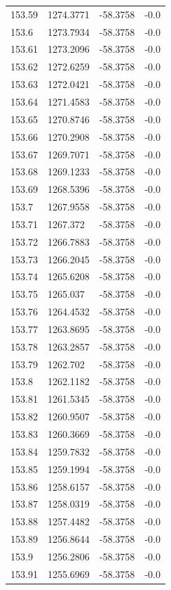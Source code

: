 \begin{table}[H]
\begin{tabular}{llll}
153.59 & 1274.3771 & -58.3758 & -0.0 \\
153.6 & 1273.7934 & -58.3758 & -0.0 \\
153.61 & 1273.2096 & -58.3758 & -0.0 \\
153.62 & 1272.6259 & -58.3758 & -0.0 \\
153.63 & 1272.0421 & -58.3758 & -0.0 \\
153.64 & 1271.4583 & -58.3758 & -0.0 \\
153.65 & 1270.8746 & -58.3758 & -0.0 \\
153.66 & 1270.2908 & -58.3758 & -0.0 \\
153.67 & 1269.7071 & -58.3758 & -0.0 \\
153.68 & 1269.1233 & -58.3758 & -0.0 \\
153.69 & 1268.5396 & -58.3758 & -0.0 \\
153.7 & 1267.9558 & -58.3758 & -0.0 \\
153.71 & 1267.372 & -58.3758 & -0.0 \\
153.72 & 1266.7883 & -58.3758 & -0.0 \\
153.73 & 1266.2045 & -58.3758 & -0.0 \\
153.74 & 1265.6208 & -58.3758 & -0.0 \\
153.75 & 1265.037 & -58.3758 & -0.0 \\
153.76 & 1264.4532 & -58.3758 & -0.0 \\
153.77 & 1263.8695 & -58.3758 & -0.0 \\
153.78 & 1263.2857 & -58.3758 & -0.0 \\
153.79 & 1262.702 & -58.3758 & -0.0 \\
153.8 & 1262.1182 & -58.3758 & -0.0 \\
153.81 & 1261.5345 & -58.3758 & -0.0 \\
153.82 & 1260.9507 & -58.3758 & -0.0 \\
153.83 & 1260.3669 & -58.3758 & -0.0 \\
153.84 & 1259.7832 & -58.3758 & -0.0 \\
153.85 & 1259.1994 & -58.3758 & -0.0 \\
153.86 & 1258.6157 & -58.3758 & -0.0 \\
153.87 & 1258.0319 & -58.3758 & -0.0 \\
153.88 & 1257.4482 & -58.3758 & -0.0 \\
153.89 & 1256.8644 & -58.3758 & -0.0 \\
153.9 & 1256.2806 & -58.3758 & -0.0 \\
153.91 & 1255.6969 & -58.3758 & -0.0 \\

\end{tabular}
\end{table}
